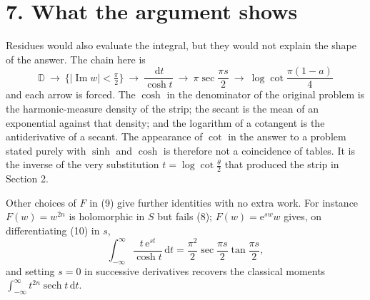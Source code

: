 \documentclass[12pt]{article}
\newcommand{\dd}{\,\mathrm{d}}
\newcommand{\e}{\mathrm{e}}
\newcommand{\D}{\mathbb D}
\newcommand{\Ip}{\operatorname{Im}}
\begin{document}
\section*{7. What the argument shows}

Residues would also evaluate the integral, but they would not explain the
shape of the answer. The chain here is
\[
\boxed{\;
\D
\ \longrightarrow\
\{|\Ip w|<\tfrac\pi2\}
\ \longrightarrow\
\frac{\dd t}{\cosh t}
\ \longrightarrow\
\pi\sec\frac{\pi s}{2}
\ \longrightarrow\
\log\cot\frac{\pi(1-a)}4\; }
\]
and each arrow is forced. The \(\cosh\) in the denominator of the
original problem is the harmonic-measure density of the strip; the secant
is the mean of an exponential against that density; and the logarithm of
a cotangent is the antiderivative of a secant. The appearance of
\(\cot\) in the answer to a problem stated purely with \(\sinh\) and
\(\cosh\) is therefore not a coincidence of tables. It is the inverse
of the very substitution \(t=\log\cot\frac\theta2\) that produced the
strip in Section 2.

Other choices of \(F\) in (9) give further identities with no extra work.
For instance \(F(w)=w^{2n}\) is holomorphic in \(S\) but fails (8);
\(F(w)=\e^{sw}w\) gives, on differentiating (10) in \(s\),
\[
\int_{-\infty}^{\infty}\frac{t\,\e^{st}}{\cosh t}\dd t
=\frac{\pi^2}{2}\sec\frac{\pi s}{2}\tan\frac{\pi s}{2},
\]
and setting \(s=0\) in successive derivatives recovers the classical
moments \(\int_{-\infty}^\infty t^{2n}\operatorname{sech}t\dd t\).
\end{document}
